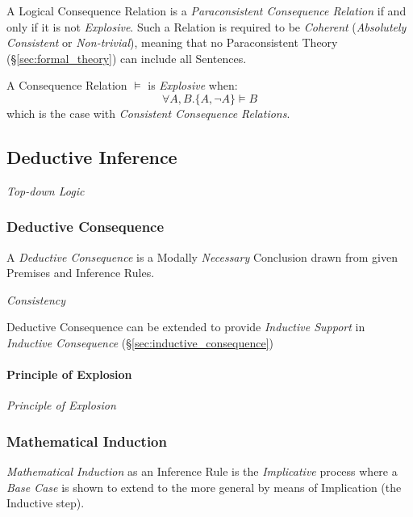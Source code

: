 A Logical Consequence Relation is a \emph{Paraconsistent Consequence
  Relation} if and only if it is not \emph{Explosive}. Such a Relation
is required to be \emph{Coherent} (\emph{Absolutely Consistent} or
\emph{Non-trivial}), meaning that no Paraconsistent Theory
(\S\ref{sec:formal_theory}) can include all Sentences.

A Consequence Relation $\vDash$ is \emph{Explosive} when:
\[
  \forall A, B. \{A, \neg A\} \vDash B
\]
which is the case with \emph{Consistent Consequence Relations}.



\subsection{Deductive Inference}\label{sec:deductive_inference}

\emph{Top-down Logic}

\subsubsection{Deductive Consequence}\label{sec:deductive_consequence}

A \emph{Deductive Consequence} is a Modally \emph{Necessary}
Conclusion drawn from given Premises and Inference Rules.

\emph{Consistency}

Deductive Consequence can be extended to provide \emph{Inductive
  Support} in \emph{Inductive Consequence}
(\S\ref{sec:inductive_consequence})



\paragraph{Principle of Explosion}\label{sec:explosion_principle}

\emph{Principle of Explosion}



\subsubsection{Mathematical Induction}\label{sec:mathematical_induction}

\emph{Mathematical Induction} as an Inference Rule is the
\emph{Implicative} process where a \emph{Base Case} is shown to extend
to the more general by means of Implication (the Inductive step).

